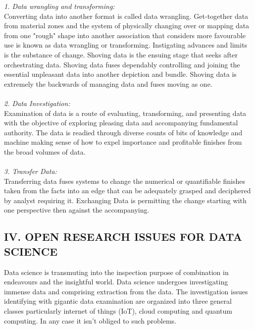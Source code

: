 \documentclass[a4paper]{article}
\begin{document}
\begin{multicols}{2}
\textit{1. Data wrangling and transforming:\\ }
Converting data into another format is called data wrangling.
Get-together data from material zones and the system of
physically changing over or mapping data from one "rough"
shape into another association that considers more favourable
use is known as data wrangling or transforming. Instigating
advances and limits is the substance of change. Shoving data is
the ensuing stage that seeks after orchestrating data. Shoving
data fuses dependably controlling and joining the essential
unpleasant data into another depiction and bundle. Shoving
data is extremely the backwards of managing data and fuses
moving as one.
\\ \\
\textit{2. Data Investigation:\\}
Examination of data is a route of evaluating, transforming, and
presenting data with the objective of exploring pleasing data
and accompanying fundamental authority. The data is readied
through diverse counts of bits of knowledge and machine
making sense of how to expel importance and profitable
finishes from the broad volumes of data. \\ \\
\textit{3. Transfer Data: \\}
Transferring data fuses systems to change the numerical or
quantifiable finishes taken from the facts into an edge that can
be adequately grasped and deciphered by analyst requiring it.
Exchanging Data is permitting the change starting with one
perspective then against the accompanying.

\subsection*{IV. OPEN RESEARCH ISSUES FOR DATA SCIENCE}
Data science is transmuting into the inspection purpose of
combination in endeavours and the insightful world. Data
science undergoes investigating immense data and comprising
extraction from the data. The investigation issues identifying
with gigantic data examination are organized into three general
classes particularly internet of things (IoT), cloud computing
and quantum computing. In any case it isn't obliged to such
problems. \\
\end{multicols}
\end{document}
